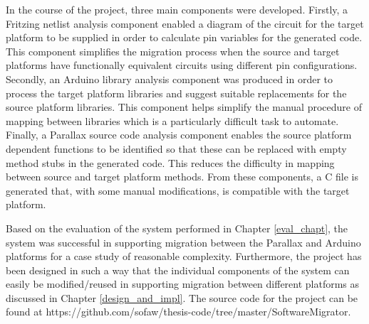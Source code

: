 \documentclass{UoYCSproject}
\begin{document}
In the course of the project, three main components were developed. Firstly, a Fritzing netlist analysis component enabled a diagram of the circuit for the target platform to be supplied in order to calculate pin variables for the generated code. This component simplifies the migration process when the source and target platforms have functionally equivalent circuits using different pin configurations. Secondly, an Arduino library analysis component was produced in order to process the target platform libraries and suggest suitable replacements for the source platform libraries. This component helps simplify the manual procedure of mapping between libraries which is a particularly difficult task to automate. Finally, a Parallax source code analysis component enables the source platform dependent functions to be identified so that these can be replaced with empty method stubs in the generated code. This reduces the difficulty in mapping between source and target platform methods. From these components, a C file is generated that, with some manual modifications, is compatible with the target platform.

Based on the evaluation of the system performed in Chapter \ref{eval_chapt}, the system was successful in supporting migration between the Parallax and Arduino platforms for a case study of reasonable complexity. Furthermore, the project has been designed in such a way that the individual components of the system can easily be modified/reused in supporting migration between different platforms as discussed in Chapter \ref{design_and_impl}. The source code for the project can be found at https://github.com/sofaw/thesis-code/tree/master/SoftwareMigrator.
\end{document}
